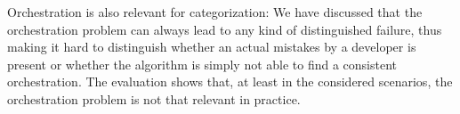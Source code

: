Orchestration is also relevant for categorization:
We have discussed that the orchestration problem can always lead to any kind of distinguished failure, thus making it hard to distinguish whether an actual mistakes by a developer is present or whether the algorithm is simply not able to find a consistent orchestration.
The evaluation shows that, at least in the considered scenarios, the orchestration problem is not that relevant in practice.




